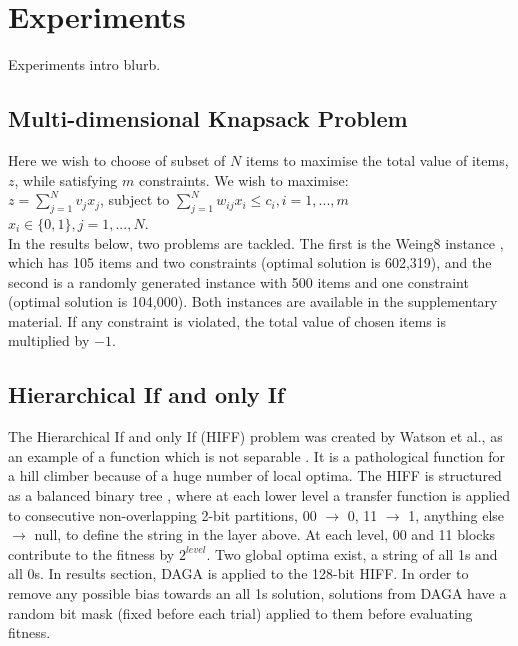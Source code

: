 \documentclass[runningheads,a4paper]{llncs}
\begin{document}
\section{Experiments}
\label{sec:experiments}
Experiments intro blurb.

\subsection{Multi-dimensional Knapsack Problem}
Here we wish to choose of subset of \(N\) items to maximise the total value of items, \(z\), while satisfying \(m\) constraints. We wish to maximise:
\vspace{2mm}\\
\(z = \sum_{j=1}^{N} v_jx_j\), subject to \(\sum_{j=1}^{N} w_{ij}x_i \leq c_i, i = 1, ..., m\)
\vspace{2mm}\\
\(x_i \in \{0,1\}, j = 1, ..., N\).
\vspace{2mm}\\
In the results below, two problems are tackled. The first is the Weing8 instance \cite{ref}, which has 105 items and two constraints (optimal solution is 602,319), and the second is a randomly generated instance with 500 items and one constraint (optimal solution is 104,000). Both instances are available in the supplementary material. If any constraint is violated, the total value of chosen items is multiplied by \(-1\).

\subsection{Hierarchical If and only If}

The Hierarchical If and only If (HIFF) problem was created by Watson et al., as an example of a function which is not separable \cite{ref}. It is a pathological function for a hill climber because of a huge number of local optima. The HIFF is structured as a balanced binary tree \cite{hboa}, where at each lower level a transfer function is applied to consecutive non-overlapping 2-bit partitions, 00 \(\rightarrow\) 0, 11 \(\rightarrow\) 1, anything else \(\rightarrow\) null, to define the string in the layer above. At each level, 00 and 11 blocks contribute to the fitness by \(2^{level}\). Two global optima exist, a string of all 1s and all 0s. In results section, DAGA is applied to the 128-bit HIFF. In order to remove any possible bias towards an all 1s solution, solutions from DAGA have a random bit mask (fixed before each trial) applied to them before evaluating fitness.
\end{document}
